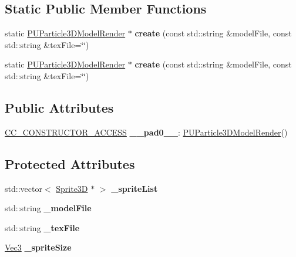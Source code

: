\subsection*{Static Public Member Functions}
\begin{DoxyCompactItemize}
\item 
\mbox{\label{classPUParticle3DModelRender_a5aff83aa71fb28643564561b8b46aca1}} 
static \hyperlink{classPUParticle3DModelRender}{P\+U\+Particle3\+D\+Model\+Render} $\ast$ {\bfseries create} (const std\+::string \&model\+File, const std\+::string \&tex\+File=\char`\"{}\char`\"{})
\item 
\mbox{\label{classPUParticle3DModelRender_aa1db04a36f696f173de3631020a57171}} 
static \hyperlink{classPUParticle3DModelRender}{P\+U\+Particle3\+D\+Model\+Render} $\ast$ {\bfseries create} (const std\+::string \&model\+File, const std\+::string \&tex\+File=\char`\"{}\char`\"{})
\end{DoxyCompactItemize}
\subsection*{Public Attributes}
\begin{DoxyCompactItemize}
\item 
\mbox{\label{classPUParticle3DModelRender_a575161d5776178941e4b8e007a9290be}} 
\hyperlink{_2cocos2d_2cocos_2base_2ccConfig_8h_a25ef1314f97c35a2ed3d029b0ead6da0}{C\+C\+\_\+\+C\+O\+N\+S\+T\+R\+U\+C\+T\+O\+R\+\_\+\+A\+C\+C\+E\+SS} {\bfseries \+\_\+\+\_\+pad0\+\_\+\+\_\+}\+: \hyperlink{classPUParticle3DModelRender}{P\+U\+Particle3\+D\+Model\+Render}()
\end{DoxyCompactItemize}
\subsection*{Protected Attributes}
\begin{DoxyCompactItemize}
\item 
\mbox{\label{classPUParticle3DModelRender_ab02a2aef30406d0b63edca38d3b2495e}} 
std\+::vector$<$ \hyperlink{classSprite3D}{Sprite3D} $\ast$ $>$ {\bfseries \+\_\+sprite\+List}
\item 
\mbox{\label{classPUParticle3DModelRender_acf411152833836e8847fe5326a1e5801}} 
std\+::string {\bfseries \+\_\+model\+File}
\item 
\mbox{\label{classPUParticle3DModelRender_a0f9c8742d8eaed68ac37547a982a647c}} 
std\+::string {\bfseries \+\_\+tex\+File}
\item 
\mbox{\label{classPUParticle3DModelRender_ae33d5058fde12c50febf82351e30860c}} 
\hyperlink{classVec3}{Vec3} {\bfseries \+\_\+sprite\+Size}
\end{DoxyCompactItemize}
